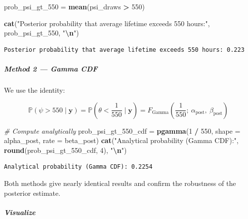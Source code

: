 \documentclass[
]{article}
\newenvironment{Shaded}{\begin{snugshade}}{\end{snugshade}}
\newcommand{\AttributeTok}[1]{\textcolor[rgb]{0.13,0.29,0.53}{#1}}
\newcommand{\CommentTok}[1]{\textcolor[rgb]{0.56,0.35,0.01}{\textit{#1}}}
\newcommand{\DecValTok}[1]{\textcolor[rgb]{0.00,0.00,0.81}{#1}}
\newcommand{\FunctionTok}[1]{\textcolor[rgb]{0.13,0.29,0.53}{\textbf{#1}}}
\newcommand{\NormalTok}[1]{#1}
\newcommand{\OtherTok}[1]{\textcolor[rgb]{0.56,0.35,0.01}{#1}}
\newcommand{\SpecialCharTok}[1]{\textcolor[rgb]{0.81,0.36,0.00}{\textbf{#1}}}
\newcommand{\StringTok}[1]{\textcolor[rgb]{0.31,0.60,0.02}{#1}}
\begin{document}
\begin{Shaded}
\begin{Highlighting}[]
\NormalTok{prob\_psi\_gt\_550 }\OtherTok{=} \FunctionTok{mean}\NormalTok{(psi\_draws }\SpecialCharTok{\textgreater{}} \DecValTok{550}\NormalTok{)}

\FunctionTok{cat}\NormalTok{(}\StringTok{"Posterior probability that average lifetime exceeds 550 hours:"}\NormalTok{, prob\_psi\_gt\_550, }\StringTok{"}\SpecialCharTok{\textbackslash{}n}\StringTok{"}\NormalTok{)}
\end{Highlighting}
\end{Shaded}

\begin{verbatim}
Posterior probability that average lifetime exceeds 550 hours: 0.223 
\end{verbatim}

\subparagraph{Method 2 --- Gamma CDF}\label{method-2-gamma-cdf}

We use the identity:

\[
\mathbb{P}\left( \psi > 550 \mid \mathbf{y} \right)
= \mathbb{P}\left( \theta < \frac{1}{550} \mid \mathbf{y} \right)
= F_{\text{Gamma}}\left( \frac{1}{550};\ \alpha_{\text{post}},\ \beta_{\text{post}} \right)
\]

\begin{Shaded}
\begin{Highlighting}[]
\CommentTok{\# Compute analytically}
\NormalTok{prob\_psi\_gt\_550\_cdf }\OtherTok{=} \FunctionTok{pgamma}\NormalTok{(}\DecValTok{1} \SpecialCharTok{/} \DecValTok{550}\NormalTok{, }\AttributeTok{shape =}\NormalTok{ alpha\_post, }\AttributeTok{rate =}\NormalTok{ beta\_post)}
\FunctionTok{cat}\NormalTok{(}\StringTok{"Analytical probability (Gamma CDF):"}\NormalTok{, }\FunctionTok{round}\NormalTok{(prob\_psi\_gt\_550\_cdf, }\DecValTok{4}\NormalTok{), }\StringTok{"}\SpecialCharTok{\textbackslash{}n}\StringTok{"}\NormalTok{)}
\end{Highlighting}
\end{Shaded}

\begin{verbatim}
Analytical probability (Gamma CDF): 0.2254 
\end{verbatim}

Both methods give nearly identical results and confirm the robustness of
the posterior estimate.

\subparagraph{Visualize}\label{visualize}
\end{document}
